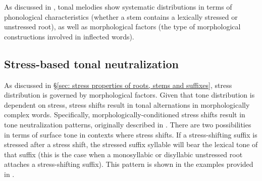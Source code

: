 As discussed in , tonal melodies show systematic distributions in terms of phonological characteristics (whether a stem contains a lexically stressed or unstressed root), as well as morphological factors (the type of morphological constructions involved in inflected words).

\subsection{Stress-based tonal neutralization}
\label{subsubsec: stress-based tonal neutralization}

As discussed in §\ref{sec: stress properties of roots, stems and suffixes}, stress distribution is governed by morphological factors. Given that tone distribution is dependent on stress, stress shifts result in tonal alternations in morphologically complex words. Specifically, morphologically-conditioned stress shifts result in tone neutralization patterns, originally described in \citet{caballero2015tone}. There are two possibilities in terms of surface tone in contexts where stress shifts. If a stress-shifting suffix is stressed after a stress shift, the stressed suffix syllable will bear the lexical tone of that suffix (this is the case when a monosyllabic or disyllabic unstressed root attaches a stress-shifting suffix). This pattern is shown in the examples provided in .

